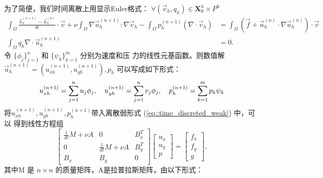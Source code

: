    为了简便，我们时间离散上用显示Euler格式：
   $\forall (\vec{v}_h, q_h) \in \mathbf{X}_0^h \times P^h$
   \begin{equation}
     \begin{aligned}
       \int_{\Omega} \frac{\vec{u}_h^{(n + 1)} -
         \vec{u}_h^{(n)}}{\delta t} \cdot \vec{v} + \nu \int_{\Omega} \nabla
       \vec{u}_h^{(n + 1)} : \nabla \vec{v}_h - \int_{\Omega} p_h^{(n
         + 1)} \left( \nabla \cdot \vec{v}_h \right)
       & = \int_{\Omega}\left(\vec{f} + \vec{u}_h^{(n)} \cdot \nabla \vec{u}_h^{(n)}
       \right) \cdot \vec{v} &\\
       \int_{\Omega} q_h \nabla \cdot \vec{u}_h^{(n + 1)} & = 0.&
     \end{aligned}
     \label{eq::time_discreted_weak}
   \end{equation}
   令 $\{\phi_j \}_{j = 1}^n$ 和 $\{\psi_k\}_{k = 1}^m$ 分别为速度和压
   力的线性元基函数。则数值解$\vec{u}_h^{(n + 1)} = (u_{xh}^{(n + 1)},
   u_{yh}^{(n + 1)}), p_h$ 可以写成如下形式：
   \begin{equation}
     u_{xh}^{(n + 1)} = \sum_{j = 1}^n u_j \phi_j, \quad u_{yh}^{(n +
       1)} = \sum_{j = 1}^n v_j \phi_j, \quad p_h^{(n + 1)} = \sum_{k
       = 1}^m p_k \psi_k \notag
   \end{equation}
   将$u_{xh}^{(n + 1)}, u_{yh}^{(n + 1)}, p_h^{(n + 1)}$带入离散弱形式
   (\ref{eq::time_discreted_weak}) 中，可以
   得到线性方程组
   \begin{equation}
     \left[
       \begin{array}{lll}
         \frac{1}{dt} M + \nu A & 0 & B_x^T \\
         0 & \frac{1}{dt} M +\nu A  & B_y^T \\
         B_x & B_y & 0
       \end{array}
     \right]
     \left[
       \begin{array}{c}
         u_x \\
         u_y \\
         p
       \end{array}
     \right] =
     \left[
       \begin{array}{c}
         f_x \\
         f_y \\
         g
       \end{array}
     \right],
     \label{eq::linear_system}
   \end{equation}
   其中M 是 $n \times n$ 的质量矩阵，A是拉普拉斯矩阵，由以下形式：
